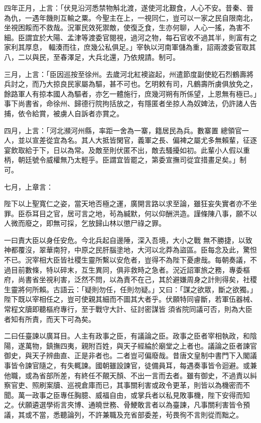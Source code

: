 \begin{pinyinscope}
 四年正月，上言：「伏見沿河悉禁物斛北渡，遂使河北艱食，人心不安。昔秦、晉為仇，一遇年饑則互輸之粟。今聖主在上，一視同仁，豈可以一家之民自限南北，坐視困餒而不救哉。況軍民效死禦敵，使復乏食，生亦何聊，人心一搖，為害不細。臣謂宜於大陽、孟津等渡委官閱視，過河之物，每石官收不過其半，則富有之家利其厚息，
 輻湊而往，庶幾公私俱足。」宰執以河南軍儲為重，詔兩渡委官取其八，二以與民，至春澤足，大兵北還，乃依規請。制可。



 三月，上言：「臣因巡按至徐州。去歲河北紅襖盜起，州遣節度副使紇石烈鶴壽將兵討之，而乃大掠良民家屬為驅，甚不可也。乞明敕有司，凡鶴壽所虜俱放免之，餘路軍人有掠本國人為驅者，亦乞一體施行，庶幾河朔有所係望，上恩無有極已。」事下尚書省，命徐州、歸德行院拘括放之，有隱匿者坐掠人為奴婢法，仍許諸人告捕，依令給賞，被虜人自訴者亦賞之。



 四月，上言：「河北瀕河州縣，率距一舍為一寨，籍居民為兵。數寨置
 總領官一人，並以宣差從宜為名。其人大抵皆閑官，義軍之長、偏裨之屬尤多無賴輩，征逐宴飲取給于下，日以為常。及敵至則伏匿不出，敵去騷擾如初。此輩小人假以重柄，朝廷號令威權無乃太輕乎。臣謂宜皆罷之，第委宣撫司從宜措畫足矣。」制可。



 七月，上章言：



 陛下以上聖寬仁之姿，當天地否極之運，廣開言路以求至論，雖狂妄失實者亦不坐罪。臣忝耳目之官，居可言之地，茍為緘默，何以仰酬洪造。謹條陳八事，願不以人微而廢之，即無可採，乞放歸山林以懲尸祿之罪。



 一曰責大臣以身任安危。今北兵起自邊陲，深入吾境，大小之戰
 無不勝捷，以致神都覆沒，翠華南狩，中原之民肝腦塗地，大河以北莽為盜區。臣每念及此，驚怛不已。況宰相大臣皆社稷生靈所繫以安危者，豈得不為陛下憂慮哉。每朝奏議，不過目前數條，特以碎末，互生異同，俱非救時之急者。況近詔軍旅之務，專委樞府，尚書省坐視利害，泛然不問，以為責不在己，其於避嫌周身之計則得矣，社稷生靈將何所賴。古語云：「疑則勿任，任則勿疑。」又曰：「謀之欲眾，斷之欲獨。」陛下既以宰相任之，豈可使親其細而不圖其大者乎。伏願特同睿斷，若軍伍器械、常程文牘即聽樞府專行，至于戰守大計、征討密謀皆
 須省院同議可否，則為大臣者知有所責，而天下可為矣。



 二曰任臺諫以廣耳目。人主有政事之臣，有議論之臣。政事之臣者宰相執政，和陰陽，遂萬物，鎮撫四夷，親附百姓，與天子經綸於廟堂之上者也。議論之臣者諫官御史，與天子辨曲直、正是非者也。二者豈可偏廢哉。昔唐文皇制中書門下入閣議事皆令諫官隨之，有失輒諫。國朝雖設諫官，徒備員耳，每遇奏事皆令迴避。或兼他職，或為省部所差，有終任不覿天顏、不出一言而去者。雖有御史，不過責以糾察官吏、照刷案牘、巡視倉庫而已，其事關利害或政令更革，則皆以為機密而不
 聞。萬一政事之臣專任胸臆、威福自由，或掌兵者以私見敗事機，陛下安得而知之。伏願遴選學術言夾博、通曉世務、骨鯁敢言者以為臺諫，凡事關利害皆令預議，其或不當，悉聽論列，不許兼職及充省部委差，茍畏徇不言則從而黜之。




\end{pinyinscope}
